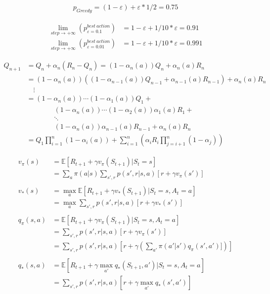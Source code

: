 \documentclass{article}
\begin{document}
\[
  \begin{aligned}
    p_{Greedy} = (1 - \varepsilon) + \varepsilon * 1/2 = 0.75
  \end{aligned}
\]

\[
  \begin{aligned}
    \lim\limits_{step\to+\infty} (p_{\varepsilon=0.1}^{best \ action}) &= 1 - \varepsilon + 1/10 * \varepsilon = 0.91 \\
    \lim\limits_{step\to+\infty} (p_{\varepsilon=0.01}^{best \ action}) &= 1 - \varepsilon + 1/10 * \varepsilon = 0.991
  \end{aligned}
\]

\[
  \begin{aligned}
    Q_{n+1} &= Q_{n} + \alpha_n (R_n - Q_n) = (1 - \alpha_n(a))Q_n + \alpha_n(a)R_n \\
            &= (1 - \alpha_n(a))((1 - \alpha_{n-1}(a))Q_{n-1} + \alpha_{n-1}(a)R_{n-1}) + \alpha_n(a)R_n\\
            & \quad \vdots\\
            &= (1 - \alpha_n(a))\cdots(1-\alpha_1(a))Q_1 + \\
            & \qquad \qquad (1 - \alpha_n(a))\cdots(1-\alpha_2(a))\alpha_1(a)R_1 + \\
            & \qquad \qquad \ddots\\
            & \qquad \qquad (1 - \alpha_n(a))\alpha_{n-1}(a)R_{n-1} + \alpha_n(a)R_n \\
            &= Q_1\prod^n_{i=1}(1 - \alpha_i(a)) + \sum^n_{i=1} (\alpha_iR_i \prod^n_{j=i+1}(1-\alpha_j))
  \end{aligned}
\]

\[
  \begin{aligned}
  v_{\pi}(s) &= \mathbb{E}[R_{t+1} + \gamma v_{\pi}(S_{t+1}) | S_{t}=s] \\
  &= \sum_{a}\pi(a|s) \sum_{s',r}p(s',r|s,a)[r + \gamma v_{\pi}(s')]\\
  \\
  v_{*}(s) &= \max_{a}\mathbb{E}[R_{t+1} + \gamma v_{*}(S_{t+1}) | S_{t}=s, A_{t}=a]\\
  &= \max_{a}\sum_{s',r}p(s',r|s,a)[r + \gamma v_{*}(s')]\\
  \\
  q_{\pi}(s,a) &= \mathbb{E}[R_{t+1} + \gamma v_{\pi}(S_{t+1}) | S_{t}=s, A_{t}=a]\\
  &= \sum_{s',r}p(s',r|s,a)[r + \gamma v_{\pi}(s')]\\
  &= \sum_{s',r}p(s',r|s,a)[r + \gamma (\sum_{a'}\pi(a'|s') q_{\pi}(s',a')])]\\
  \\
  q_{*}(s,a) &= \mathbb{E}[R_{t+1} + \gamma \max_{a'}q_{*}(S_{t+1}, a') | S_{t}=s, A_{t}=a]\\
  &= \sum_{s',r}p(s',r|s,a)[r + \gamma \max_{a'}q_{*}(s', a')]
  \end{aligned}
\]
\end{document}
